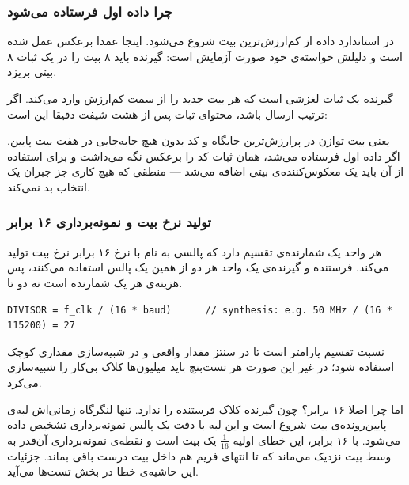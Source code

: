 \documentclass[10pt,a4paper]{article}
\begin{document}
\subsubsection*{چرا داده ‌اول فرستاده می‌شود}

در  استاندارد داده از کم‌ارزش‌ترین بیت شروع می‌شود. اینجا عمدا برعکس عمل شده است و دلیلش خواسته‌ی خود صورت آزمایش است: گیرنده باید ۸ بیت را در {یک ثبات ۸ بیتی} بریزد.

گیرنده یک ثبات لغزشی است که هر بیت جدید را از سمت کم‌ارزش وارد می‌کند. اگر ترتیب ارسال  باشد، محتوای ثبات پس از هشت شیفت دقیقا این است:

\begin{center}
\end{center}

یعنی بیت توازن در پرارزش‌ترین جایگاه و کد  بدون هیچ جابه‌جایی در هفت بیت پایین. اگر داده ‌اول فرستاده می‌شد، همان ثبات کد  را {برعکس} نگه می‌داشت و برای استفاده از آن باید یک معکوس‌کننده‌ی بیتی اضافه می‌شد — منطقی که هیچ کاری جز جبران یک انتخاب بد نمی‌کند.

\subsubsection*{تولید نرخ بیت و نمونه‌برداری ۱۶ برابر}

هر واحد یک شمارنده‌ی تقسیم دارد که پالسی به نام  با نرخ {۱۶ برابر} نرخ بیت تولید می‌کند. فرستنده و گیرنده‌ی یک واحد هر دو از همین یک پالس استفاده می‌کنند، پس هزینه‌ی هر  یک شمارنده است نه دو تا.

\begin{latin}
\begin{lstlisting}[style=verilog,numbers=none]
DIVISOR = f_clk / (16 * baud)      // synthesis: e.g. 50 MHz / (16 * 115200) = 27
\end{lstlisting}
\end{latin}

نسبت تقسیم پارامتر است تا در سنتز مقدار واقعی و در شبیه‌سازی مقداری کوچک استفاده شود؛ در غیر این صورت هر تست‌بنچ باید میلیون‌ها کلاک بی‌کار را شبیه‌سازی می‌کرد.

اما چرا اصلا ۱۶ برابر؟ چون گیرنده کلاک فرستنده را ندارد. تنها لنگرگاه زمانی‌اش لبه‌ی پایین‌رونده‌ی بیت شروع است و این لبه با دقت {یک پالس نمونه‌برداری} تشخیص داده می‌شود. با ۱۶ برابر، این خطای اولیه $\frac{1}{16}$ یک بیت است و نقطه‌ی نمونه‌برداری آن‌قدر به وسط بیت نزدیک می‌ماند که تا انتهای فریم هم داخل بیت درست باقی بماند. جزئیات این حاشیه‌ی خطا در بخش تست‌ها می‌آید.
\end{document}
